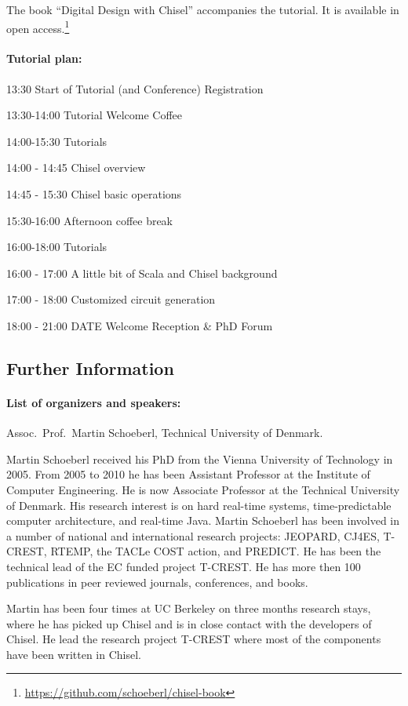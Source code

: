 \documentclass{article}
\begin{document}
The book ``Digital Design with Chisel'' accompanies the tutorial.
It is available in open access.\footnote{\url{https://github.com/schoeberl/chisel-book}}


\paragraph{Tutorial plan:}

13:30 Start of Tutorial (and Conference) Registration

13:30-14:00 Tutorial Welcome Coffee

14:00-15:30 Tutorials

14:00 - 14:45 Chisel overview

14:45 - 15:30 Chisel basic operations

15:30-16:00 Afternoon coffee break

16:00-18:00 Tutorials

16:00 - 17:00 A little bit of Scala and Chisel background 

17:00 - 18:00 Customized circuit generation

18:00 - 21:00 DATE Welcome Reception \& PhD Forum


\subsection*{Further Information}

\paragraph{List of organizers and speakers:}
Assoc.~Prof.~Martin Schoeberl, Technical University of Denmark.

Martin Schoeberl received his PhD from the Vienna University of Technology in 2005. From 2005 to 2010 he has been Assistant Professor at the Institute of Computer Engineering. He is now Associate Professor at the Technical University of Denmark. His research interest is on hard real-time systems, time-predictable computer architecture, and real-time Java.  Martin Schoeberl has been involved in a number of national and international research projects: JEOPARD, CJ4ES, T-CREST, RTEMP, the TACLe COST action, and PREDICT.  He has been the technical lead of the EC funded project T-CREST.  He has more then 100 publications in peer reviewed journals, conferences, and books.

Martin has been four times at UC Berkeley on three months research stays, where he has picked up Chisel
and is in close contact with the developers of Chisel.
He lead the research project T-CREST where most of the components have been written in Chisel.
\end{document}
